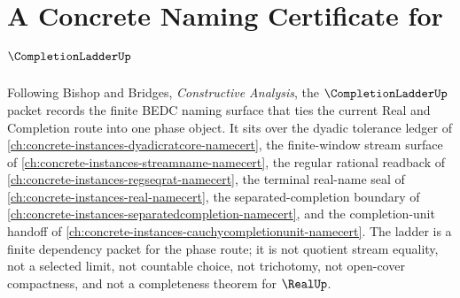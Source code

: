 \chapter{A Concrete Naming Certificate for $\CompletionLadderUp$}
\label{ch:concrete-instances-completion-ladder-namecert}

Following Bishop and Bridges, \emph{Constructive Analysis}, the $\CompletionLadderUp$ packet records the finite BEDC naming surface that ties the current Real and Completion route into one phase object. It sits over the dyadic tolerance ledger of \autoref{ch:concrete-instances-dyadicratcore-namecert}, the finite-window stream surface of \autoref{ch:concrete-instances-streamname-namecert}, the regular rational readback of \autoref{ch:concrete-instances-regseqrat-namecert}, the terminal real-name seal of \autoref{ch:concrete-instances-real-namecert}, the separated-completion boundary of \autoref{ch:concrete-instances-separatedcompletion-namecert}, and the completion-unit handoff of \autoref{ch:concrete-instances-cauchycompletionunit-namecert}. The ladder is a finite dependency packet for the phase route; it is not quotient stream equality, not a selected limit, not countable choice, not trichotomy, not open-cover compactness, and not a completeness theorem for $\RealUp$.

